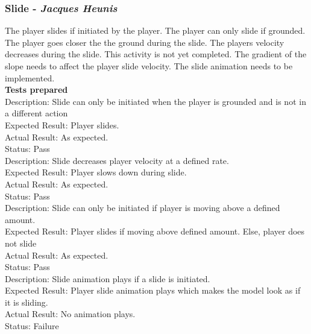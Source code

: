 \documentclass[a4paper,10pt]{article}
\begin{document}
\subsubsection{Slide - \textit{Jacques Heunis}}
The player slides if initiated by the player. The player can only slide if grounded. The player goes closer the the ground during the slide. The players velocity decreases during the slide. This activity is not yet completed. The gradient of the slope needs to affect the player slide velocity. The slide animation needs to be implemented.
\smallskip\\\textbf{Tests prepared}\\
Description: Slide can only be initiated when the player is grounded and is not in a different action\\
Expected Result: Player slides.\\
Actual Result: As expected.\\
Status: Pass
\smallskip\\
Description: Slide decreases player velocity at a defined rate. \\
Expected Result: Player slows down during slide.\\
Actual Result: As expected.\\
Status: Pass
\smallskip\\
Description: Slide can only be initiated if player is moving above a defined amount. \\
Expected Result: Player slides if moving above defined amount. Else, player does not slide\\
Actual Result: As expected.\\
Status: Pass
\smallskip\\
Description: Slide animation plays if a slide is initiated. \\
Expected Result: Player slide animation plays which makes the model look as if it is sliding.\\
Actual Result: No animation plays.\\
Status: Failure
\end{document}
